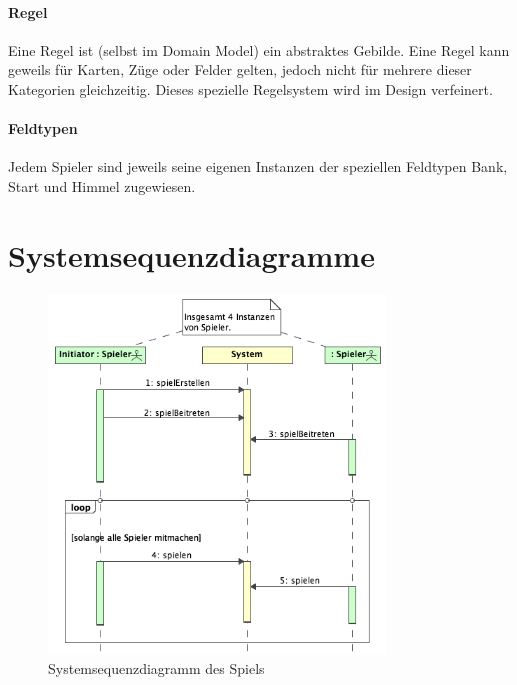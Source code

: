 \documentclass[a4paper,12pt,halfparskip,DIV14]{scrartcl}
\begin{document}
\paragraph{Regel}\label{ssub:regel} %
Eine Regel ist (selbst im Domain Model) ein abstraktes Gebilde. Eine Regel kann geweils für Karten, Züge oder Felder gelten, jedoch nicht für mehrere dieser Kategorien gleichzeitig. Dieses spezielle Regelsystem wird im Design verfeinert.
\paragraph{Feldtypen}\label{ssub:feldtypen} %
Jedem Spieler sind jeweils seine eigenen Instanzen der speziellen Feldtypen Bank, Start und Himmel zugewiesen.

\section{Systemsequenzdiagramme}\label{cha:systemsequenzdiagramme} %
\begin{figure}
	[htp] \centering 
	\includegraphics[width=0.8\textwidth]{SystemSequenzDiagramm.png} \caption{Systemsequenzdiagramm des Spiels}\label{fig:SystemSequenzDiagramm.png} 
\end{figure}
\end{document}
